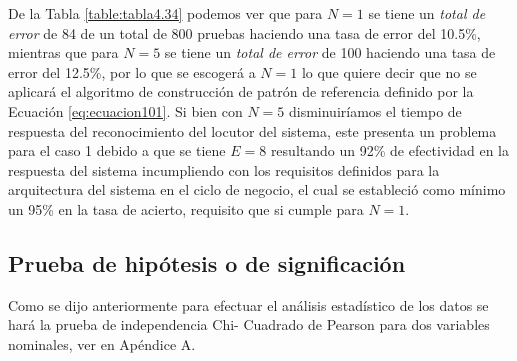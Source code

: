 De la Tabla \ref{table:tabla4.34} podemos ver que para $N = 1$ se tiene un \textit{total de error} de 84 de un total de 800 pruebas haciendo una tasa de error del 10.5\%, mientras que para $N = 5$ se tiene un \textit{total de error} de 100 haciendo una tasa de error del 12.5\%, por lo que se escogerá a $N = 1$ lo que quiere decir que no se aplicará el algoritmo de construcción de patrón de referencia definido por la Ecuación \eqref{eq:ecuacion101}. 
\vskip 0.5cm
Si bien con $N = 5$ disminuiríamos el tiempo de respuesta del reconocimiento del locutor del sistema, este presenta un problema para el caso 1 debido a que se tiene $E = 8$ resultando un 92\% de efectividad en la respuesta del sistema incumpliendo con los requisitos definidos para la arquitectura del sistema en el ciclo de negocio, el cual se estableció como mínimo un 95\% en la tasa de acierto, requisito que si cumple para $N = 1$.

\subsection{Prueba de hipótesis o de significación}
Como se dijo anteriormente para efectuar el análisis estadístico de los datos se hará la prueba de independencia Chi- Cuadrado de Pearson para dos variables nominales, ver en Apéndice A.

